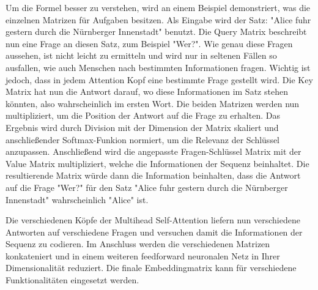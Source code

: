 Um die Formel besser zu verstehen, wird an einem Beispiel demonstriert, was die einzelnen Matrizen für Aufgaben besitzen.
Als Eingabe wird der Satz: "Alice fuhr gestern durch die Nürnberger Innenstadt" benutzt.
Die Query Matrix beschreibt nun eine Frage an diesen Satz, zum Beispiel "Wer?".
Wie genau diese Fragen aussehen, ist nicht leicht zu ermitteln und wird nur in seltenen Fällen so ausfallen, wie auch Menschen nach bestimmten Informationen fragen.
Wichtig ist jedoch, dass in jedem Attention Kopf eine bestimmte Frage gestellt wird.
Die Key Matrix hat nun die Antwort darauf, wo diese Informationen im Satz stehen könnten, also wahrscheinlich im ersten Wort. 
Die beiden Matrizen werden nun multipliziert, um die Position der Antwort auf die Frage zu erhalten. 
Das Ergebnis wird durch Division mit der Dimension der Matrix skaliert und anschließender Softmax-Funkion normiert, um die Relevanz der Schlüssel anzupassen.
Anschließend wird die angepasste Fragen-Schlüssel Matrix mit der Value Matrix multipliziert, welche die Informationen der Sequenz beinhaltet. 
Die resultierende Matrix würde dann die Information beinhalten, dass die Antwort auf die Frage "Wer?" für den Satz "Alice fuhr gestern durch die Nürnberger Innenstadt" wahrscheinlich "Alice" ist.

Die verschiedenen Köpfe der Multihead Self-Attention liefern nun verschiedene Antworten auf verschiedene Fragen und versuchen damit die Informationen der Sequenz zu codieren.
Im Anschluss werden die verschiedenen Matrizen konkateniert und in einem weiteren feedforward neuronalen Netz in Ihrer Dimensionalität reduziert.
Die finale Embeddingmatrix kann für verschiedene Funktionalitäten eingesetzt werden.

